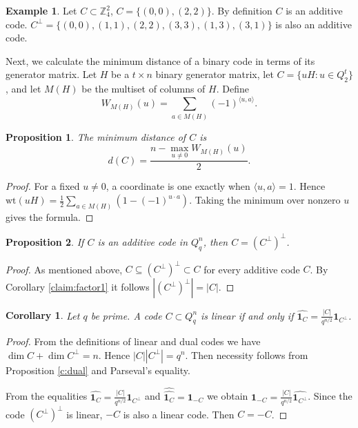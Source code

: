\documentclass[11pt]{article}
\newtheorem{claim}{Proposition}[section]
\newtheorem{corollary}{Corollary}[section]
\theoremstyle{definition}
\newtheorem{example}{Example}[section]
\begin{document}
{{{\begin{example}
Let $C\subset \mathbb{Z}_4^2$, $C=\{ (0,0), (2,2)\}$. By definition $C$ is an additive code.  $C^\perp=\{(0,0),(1,1), (2,2), (3,3), (1,3), (3,1)\}$ is also an additive code.
\end{example}

Next, we calculate the minimum distance of a binary code in terms of its generator matrix. 
 Let $H$ be a $t\times n$ binary generator matrix, let $C=\{uH : u\in Q_2^t\}$, and let $M(H)$ be the multiset of columns of $H$.  Define
\[
W_{M(H)}(u)=\sum_{a\in M(H)}(-1)^{\langle u, a\rangle}.
\]
\begin{claim}\label{p3_sidon}
The minimum distance of $C$ is
\[
 d(C)=\frac{n-\max_{u\ne0}W_{M(H)}(u)}{2}.
\]
\end{claim}
\begin{proof}
For a fixed $u\ne0$, a coordinate is one exactly when $\langle u, a\rangle=1$.  Hence
$\mathrm{wt}(uH)=\frac12\sum_{a\in M(H)}(1-(-1)^{u\cdot a})$.
Taking the minimum over nonzero $u$ gives the formula.
\end{proof}


\begin{claim}\label{cor:doubledual}
 If $C$ is an additive  code in $Q_q^n$, then
$C=(C^\perp)^\perp$.
\end{claim}
\begin{proof}
As mentioned above, $C\subseteq (C^\perp)^\perp\subset C$   for every additive code $C$. 
By Corollary \ref{claim:factor1} it follows $|(C^\perp)^\perp|= |C|$.
\end{proof}




\begin{corollary}\label{cor:face2}
Let $q$ be prime.  A code $C\subset Q_q^n$ is linear if and only if
$\widehat{{\mathbf 1}_{C}}=\frac{|C|}{q^{n/2}}{\mathbf 1}_{C^\perp}$.
\end{corollary}
\begin{proof}
From the definitions of linear and dual codes we have $\dim C+ \dim
C^\perp=n$. Hence $|C||C^\perp|=q^n$. Then necessity follows from Proposition
\ref{c:dual} and Parseval's equality.

From the equalities
$\widehat{{\mathbf 1}_{C}}=\frac{|C|}{q^{n/2}}{\mathbf 1}_{C^\perp}$  and $\widehat{\widehat{{\mathbf 1}_C}}={\mathbf 1}_{-C}$ we obtain
${\mathbf 1}_{-C}=\frac{|C|}{q^{n/2}}\widehat{{\mathbf 1}_{C^\perp}}$.
Since the code $(C^\perp)^\perp$ is linear, $-C$ is also a linear code.   Then $C=-C$.
\end{proof}


}}}
\end{document}

